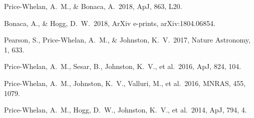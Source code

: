 \documentclass{article}
\begin{document}

\begin{publications}
    Price-Whelan, A.~M., \& Bonaca, A.\ 2018, ApJ, 863, L20.

    Bonaca, A., \& Hogg, D.~W.\ 2018, ArXiv e-prints, arXiv:1804.06854.

    Pearson, S., Price-Whelan, A.~M., \& Johnston, K.~V.\ 2017, Nature Astronomy, 1, 633.

    Price-Whelan, A.~M., Sesar, B., Johnston, K.~V., et al.\ 2016, ApJ, 824, 104.

    Price-Whelan, A.~M., Johnston, K.~V., Valluri, M., et al.\ 2016, MNRAS, 455, 1079.

    Price-Whelan, A.~M., Hogg, D.~W., Johnston, K.~V., et al.\ 2014, ApJ, 794, 4.
\end{publications}

\begin{relationto}
\relatobs{}{}{}{}
\relatobs{}{}{}{}
\relatobs{}{}{}{}
\relatobs{}{}{}{}
\relatobs{}{}{}{}
\end{relationto}

\begin{previoususe}
\pastrun{}{}{}{}{}
\pastrun{}{}{}{}{}
\pastrun{}{}{}{}{}
\pastrun{}{}{}{}{}
\pastrun{}{}{}{}{}
\pastrun{}{}{}{}{}
\end{previoususe}




\begin{observingrun}
\run{}{}{}{}{}{}{}
\run{}{}{}{}{}{}{}
\orcomment{}
\end{observingrun}
\end{document}

